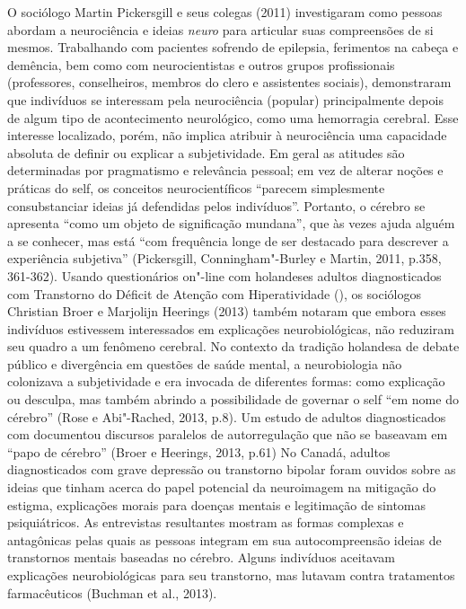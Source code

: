O sociólogo Martin Pickersgill e seus colegas (2011) investigaram como
pessoas abordam a neurociência e ideias \emph{neuro} para articular suas
compreensões de si mesmos. Trabalhando com pacientes sofrendo de
epilepsia, ferimentos na cabeça e demência, bem como com neurocientistas
e outros grupos profissionais (professores, conselheiros, membros do
clero e assistentes sociais), demonstraram que indivíduos se interessam
pela neurociência (popular) principalmente depois de algum tipo de
acontecimento neurológico, como uma hemorragia cerebral. Esse interesse
localizado, porém, não implica atribuir à neurociência uma capacidade
absoluta de definir ou explicar a subjetividade. Em geral as atitudes
são determinadas por pragmatismo e relevância pessoal; em vez de alterar
noções e práticas do self, os conceitos neurocientíficos ``parecem
simplesmente consubstanciar ideias já defendidas pelos indivíduos''.
Portanto, o cérebro se apresenta ``como um objeto de significação
mundana'', que às vezes ajuda alguém a se conhecer, mas está ``com
frequência longe de ser destacado para descrever a experiência
subjetiva'' (Pickersgill, Conningham"-Burley e Martin, 2011, p.358,
361-362). Usando questionários on"-line com holandeses adultos
diagnosticados com Transtorno do Déficit de Atenção com Hiperatividade
(), os sociólogos Christian Broer e Marjolijn Heerings (2013) também
notaram que embora esses indivíduos estivessem interessados em
explicações neurobiológicas, não reduziram seu quadro a um fenômeno
cerebral. No contexto da tradição holandesa de debate público e
divergência em questões de saúde mental, a neurobiologia não colonizava
a subjetividade e era invocada de diferentes formas: como explicação ou
desculpa, mas também abrindo a possibilidade de governar o self ``em
nome do cérebro'' (Rose e Abi"-Rached, 2013, p.8). Um estudo de adultos
diagnosticados com  documentou discursos paralelos de autorregulação
que não se baseavam em ``papo de cérebro'' (Broer e Heerings, 2013,
p.61) No Canadá, adultos diagnosticados com grave depressão ou
transtorno bipolar foram ouvidos sobre as ideias que tinham acerca do
papel potencial da neuroimagem na mitigação do estigma, explicações
morais para doenças mentais e legitimação de sintomas psiquiátricos. As
entrevistas resultantes mostram as formas complexas e antagônicas pelas
quais as pessoas integram em sua autocompreensão ideias de transtornos
mentais baseadas no cérebro. Alguns indivíduos aceitavam explicações
neurobiológicas para seu transtorno, mas lutavam contra tratamentos
farmacêuticos (Buchman et al., 2013).

